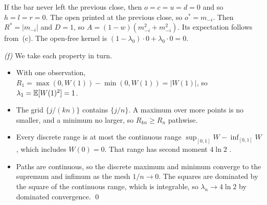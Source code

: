 If the bar never left the previous close, then $o=c=u=d=0$ and so $h=l=r=0$. The open printed at the
previous close, so $o^*=m_{-i}$. Then $R^*=|m_{-i}|$ and $D=1$, so $A=(1-w)(m_{-i}^2+m_{-i}^2)$. Its
expectation follows from~(c). The open-free kernel is $(1-\lambda_0)\cdot0+\lambda_0\cdot0=0$.

\emph{(f)} We take each property in turn.
\begin{itemize}
  \item With one observation, $R_1=\max(0,W(1))-\min(0,W(1))=|W(1)|$, so $\lambda_1=\mathbb{E}[W(1)^2]=1$.
  \item The grid $\{j/(kn)\}$ contains $\{j/n\}$. A maximum over more points is no smaller, and a
        minimum no larger, so $R_{kn}\ge R_n$ pathwise.
  \item Every discrete range is at most the continuous range $\sup_{[0,1]}W-\inf_{[0,1]}W$, which
        includes $W(0)=0$. That range has second moment $4\ln2$ \citep{Parkinson1980}.
  \item Paths are continuous, so the discrete maximum and minimum converge to the supremum and infimum
        as the mesh $1/n\to0$. The squares are dominated by the square of the continuous range, which
        is integrable, so $\lambda_n\to4\ln2$ by dominated convergence. \qed
\end{itemize}

